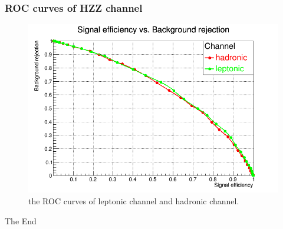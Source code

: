 \documentclass{beamer}
\begin{document}
\begin{frame}
\frametitle{ROC curves of HZZ channel}
\begin{figure}
\includegraphics[scale=0.25]{./figures/ROC_channel_points.png}
\caption{the ROC curves of leptonic channel and hadronic channel.}
\end{figure}
\end{frame}




\begin{frame}
\Huge{\centerline{The End}}
\end{frame}

\end{document}
